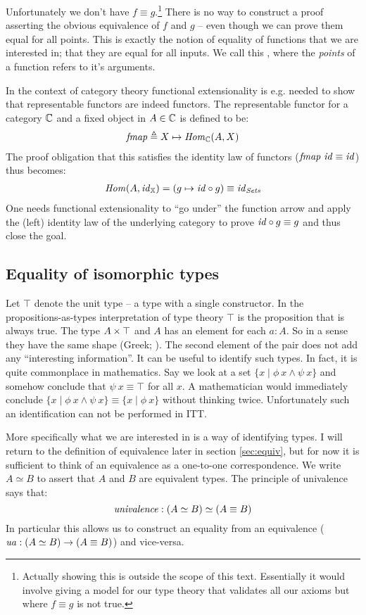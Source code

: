 Unfortunately we don't have $f \equiv g$.\footnote{Actually showing this is
outside the scope of this text. Essentially it would involve giving a model
for our type theory that validates all our axioms but where $f \equiv g$ is
not true.} There is no way to construct a proof asserting the obvious
equivalence of $f$ and $g$ -- even though we can prove them equal for all
points. This is exactly the notion of equality of functions that we are
interested in; that they are equal for all inputs. We call this
, where the \emph{points} of a function refers
to it's arguments.

In the context of category theory functional extensionality is e.g. needed to
show that representable functors are indeed functors. The representable functor
for a category $\mathbb{C}$ and a fixed object in $A \in \mathbb{C}$ is defined to be:
%
\begin{align*}
\mathit{fmap} \mathrel{\triangleq} X \mapsto \mathit{Hom}_{\mathbb{C}}(A, X)
\end{align*}
%
The proof obligation that this satisfies the identity law of functors
($\mathit{fmap}\ \mathit{id} \equiv \mathit{id}$) thus becomes:
%
\begin{align*}
\mathit{Hom}(A, \mathit{id}_{\mathbb{X}}) = (g \mapsto \mathit{id} \circ g) \equiv \mathit{id}_{\mathit{Sets}}
\end{align*}
%
One needs functional extensionality to ``go under'' the function arrow and apply
the (left) identity law of the underlying category to prove $\mathit{id} \circ g
\equiv g$ and thus close the goal.
%
\subsection{Equality of isomorphic types}
%
Let $\top$ denote the unit type -- a type with a single constructor. In the
propositions-as-types interpretation of type theory $\top$ is the proposition
that is always true. The type $A \times \top$ and $A$ has an element for each $a :
A$. So in a sense they have the same shape (Greek; ). The
second element of the pair does not add any ``interesting information''. It can
be useful to identify such types. In fact, it is quite commonplace in
mathematics. Say we look at a set $\{x \mid \phi\ x \land \psi\ x\}$ and somehow
conclude that $\psi\ x \equiv \top$ for all $x$. A mathematician would
immediately conclude $\{x \mid \phi\ x \land \psi\ x\} \equiv \{x \mid
\phi\ x\}$ without thinking twice. Unfortunately such an identification can not
be performed in ITT.

More specifically what we are interested in is a way of identifying
 types. I will return to the definition of equivalence later
in section \ref{sec:equiv}, but for now it is sufficient to think of an
equivalence as a one-to-one correspondence. We write $A \simeq B$ to assert that
$A$ and $B$ are equivalent types. The principle of univalence says that:
%
$$\mathit{univalence} \mathrel{:} (A \simeq B) \simeq (A \equiv B)$$
%
In particular this allows us to construct an equality from an equivalence
($\mathit{ua} \mathrel{:} (A \simeq B) \to (A \equiv B)$) and vice-versa.

